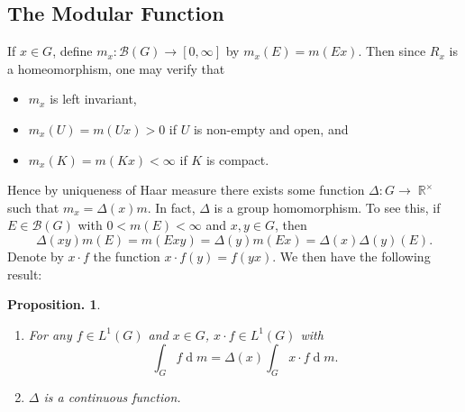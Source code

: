 \documentclass[11pt, a4paper]{memoir}
\DeclareMathOperator{\R}{{\mathbb{R}}}
\theoremstyle{change}
\newtheorem{proposition}[theorem]{Proposition.}
\theoremstyle{plain}
\theoremstyle{nonumberplain}
\renewcommand{\d}[1]{\ensuremath{\operatorname{d}\!{#1}}}
\numberwithin{equation}{section}
\begin{document}
\subsection{The Modular Function}
If $x\in G$, define $m_x:\mathcal{B}(G)\to[0,\infty]$ by $m_x(E)=m(Ex)$.
Then since $R_x$ is a homeomorphism, one may verify that
\begin{itemize}[nl]
    \item $m_x$ is left invariant,
    \item $m_x(U)=m(Ux)>0$ if $U$ is non-empty and open, and
    \item $m_x(K)=m(Kx)<\infty$ if $K$ is compact.
\end{itemize}
Hence by uniqueness of Haar measure there exists some function $\Delta:G\to\R^\times$ such that $m_x=\Delta(x)m$.
In fact, $\Delta$ is a group homomorphism.
To see this, if $E\in\mathcal{B}(G)$ with $0<m(E)<\infty$ and $x,y\in G$, then
\begin{equation*}
    \Delta(xy)m(E)=m(Exy)=\Delta(y)m(Ex)=\Delta(x)\Delta(y)(E).
\end{equation*}
Denote by $x\cdot f$ the function $x\cdot f(y)=f(yx)$.
We then have the following result:
\begin{proposition}
    \begin{enumerate}[nl,r]
        \item For any $f\in L^1(G)$ and $x\in G$, $x\cdot f\in L^1(G)$ with
            \begin{equation*}
                \int_G f\d{m}=\Delta(x)\int_G x\cdot f\d{m}.
            \end{equation*}
        \item $\Delta$ is a continuous function.
    \end{enumerate}
\end{proposition}
\end{document}
